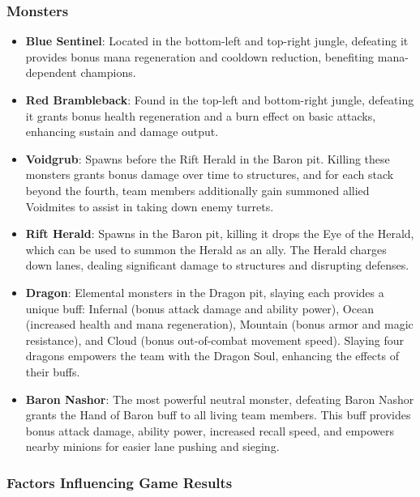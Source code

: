 \documentclass[11pt,a4paper,oneside]{report}
\begin{document}
\subsubsection{Monsters}

\begin{itemize}
  \item \textbf{Blue Sentinel}: Located in the bottom-left and top-right jungle, defeating it provides bonus mana regeneration and cooldown reduction, benefiting mana-dependent champions.

  \item \textbf{Red Brambleback}: Found in the top-left and bottom-right jungle, defeating it grants bonus health regeneration and a burn effect on basic attacks, enhancing sustain and damage output.

  \item \textbf{Voidgrub}: Spawns before the Rift Herald in the Baron pit. Killing these monsters grants bonus damage over time to structures, and for each stack beyond the fourth, team members additionally gain summoned allied Voidmites to assist in taking down enemy turrets.

  \item \textbf{Rift Herald}: Spawns in the Baron pit, killing it drops the Eye of the Herald, which can be used to summon the Herald as an ally. The Herald charges down lanes, dealing significant damage to structures and disrupting defenses.

  \item \textbf{Dragon}: Elemental monsters in the Dragon pit, slaying each provides a unique buff: Infernal (bonus attack damage and ability power), Ocean (increased health and mana regeneration), Mountain (bonus armor and magic resistance), and Cloud (bonus out-of-combat movement speed). Slaying four dragons empowers the team with the Dragon Soul, enhancing the effects of their buffs.

  \item \textbf{Baron Nashor}: The most powerful neutral monster, defeating Baron Nashor grants the Hand of Baron buff to all living team members. This buff provides bonus attack damage, ability power, increased recall speed, and empowers nearby minions for easier lane pushing and sieging.
\end{itemize}

\subsubsection{Factors Influencing Game Results}
\end{document}
